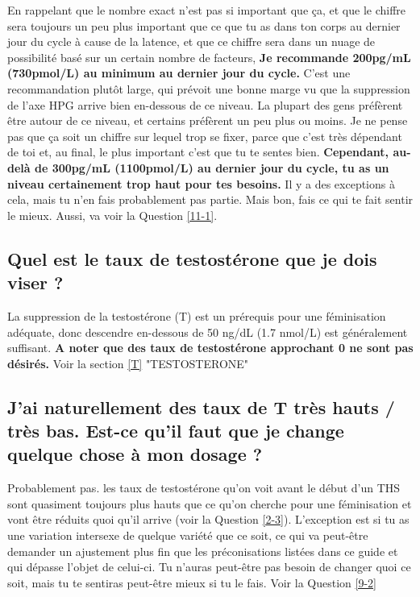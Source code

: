 \documentclass{article}
\begin{document}
En rappelant que le nombre exact n'est pas si important que ça, et que le chiffre sera toujours un peu plus important que ce que tu as dans ton corps au dernier jour du cycle à cause de la latence, et que ce chiffre sera dans un nuage de possibilité basé sur un certain nombre de facteurs, \textbf{Je recommande 200pg/mL (730pmol/L) au minimum au dernier jour du cycle.} C'est une recommandation plutôt large, qui prévoit une bonne marge vu que la suppression de l'axe HPG arrive bien en-dessous de ce niveau. La plupart des gens préfèrent être autour de ce niveau, et certains préfèrent un peu plus ou moins. Je ne pense pas que ça soit un chiffre sur lequel trop se fixer, parce que c'est très dépendant de toi et, au final, le plus important c'est que tu te sentes bien. \textbf{Cependant, au-delà de 300pg/mL (1100pmol/L) au dernier jour du cycle, tu as un niveau certainement trop haut pour tes besoins.} Il y a des exceptions à cela, mais tu n'en fais probablement pas partie. Mais bon, fais ce qui te fait sentir le mieux. Aussi, va voir la Question \ref{11-1}.

\subsection{Quel est le taux de testostérone que je dois viser ?}

La suppression de la testostérone (T) est un prérequis pour une féminisation adéquate, donc descendre en-dessous de 50 ng/dL (1.7 nmol/L) est généralement suffisant. \textbf{A noter que des taux de testostérone approchant 0 ne sont pas désirés.} Voir la section \ref{T} "TESTOSTERONE" 

\subsection{J'ai naturellement des taux de T très hauts / très bas. Est-ce qu'il faut que je change quelque chose à mon dosage ?}

Probablement pas. les taux de testostérone qu'on voit avant le début d'un THS sont quasiment toujours plus hauts que ce qu'on cherche pour une féminisation et vont être réduits quoi qu'il arrive (voir la Question \ref{2-3}). L'exception est si tu as une variation intersexe de quelque variété que ce soit, ce qui va peut-être demander un ajustement plus fin que les préconisations listées dans ce guide et qui dépasse l'objet de celui-ci. Tu n'auras peut-être pas besoin de changer quoi ce soit, mais tu te sentiras peut-être mieux si tu le fais. Voir la Question \ref{9-2}
\end{document}
